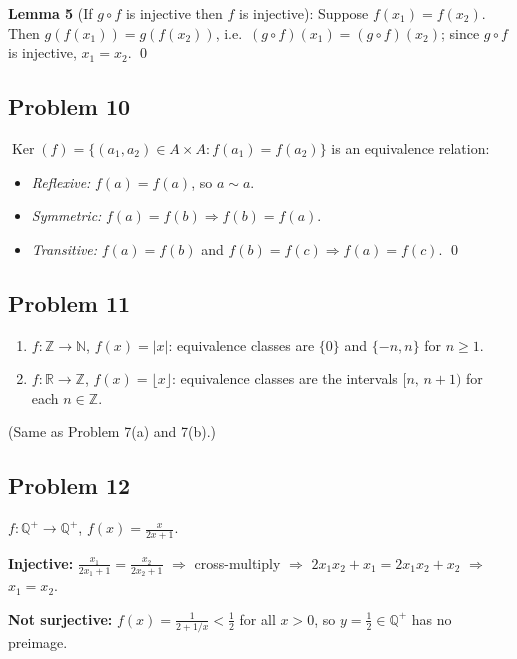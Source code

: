 \textbf{Lemma 5} (If $g\circ f$ is injective then $f$ is injective): Suppose $f(x_1)=f(x_2)$. Then $g(f(x_1))=g(f(x_2))$, i.e.\ $(g\circ f)(x_1)=(g\circ f)(x_2)$; since $g\circ f$ is injective, $x_1=x_2$. \qed

\subsection*{Problem 10}
$\operatorname{Ker}(f) = \{(a_1,a_2)\in A\times A : f(a_1)=f(a_2)\}$ is an equivalence relation:
\begin{itemize}[nosep]
  \item \emph{Reflexive:} $f(a)=f(a)$, so $a\sim a$.
  \item \emph{Symmetric:} $f(a)=f(b)\Rightarrow f(b)=f(a)$.
  \item \emph{Transitive:} $f(a)=f(b)$ and $f(b)=f(c)\Rightarrow f(a)=f(c)$. \qed
\end{itemize}

\subsection*{Problem 11}
\begin{enumerate}[label=(\alph*), nosep]
  \item $f:\mathbb{Z}\to\mathbb{N}$, $f(x)=|x|$:\; equivalence classes are $\{0\}$ and $\{-n,n\}$ for $n\geq 1$.
  \item $f:\mathbb{R}\to\mathbb{Z}$, $f(x)=\lfloor x\rfloor$:\; equivalence classes are the intervals $[n,\,n+1)$ for each $n\in\mathbb{Z}$.
\end{enumerate}
(Same as Problem 7(a) and 7(b).)

\subsection*{Problem 12}
$f:\mathbb{Q}^+\to\mathbb{Q}^+$, $f(x)=\frac{x}{2x+1}$.

\textbf{Injective:} $\frac{x_1}{2x_1+1}=\frac{x_2}{2x_2+1}$ $\Rightarrow$ cross-multiply $\Rightarrow$ $2x_1x_2+x_1=2x_1x_2+x_2$ $\Rightarrow$ $x_1=x_2$. \checkmark

\textbf{Not surjective:} $f(x)=\frac{1}{2+1/x}<\frac{1}{2}$ for all $x>0$, so $y=\frac{1}{2}\in\mathbb{Q}^+$ has no preimage. \checkmark

